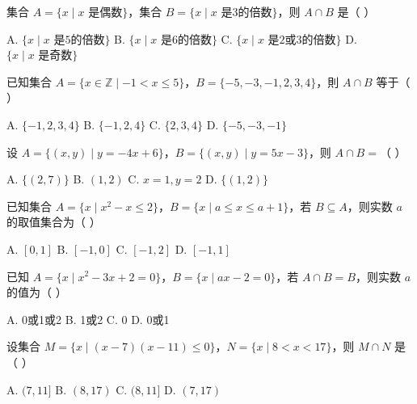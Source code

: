 \documentclass[11pt, a4paper]{article}
\begin{document}
\begin{baitap}[6]
集合 $A=\{x\mid x\text{ 是偶数}\}$，集合 $B=\{x\mid x\text{ 是3的倍数}\}$，则 $A\cap B$ 是（ ）
\par\vspace{3pt}
\noindent A. $\{x\mid x\text{ 是5的倍数}\}$ \quad B. $\{x\mid x\text{ 是6的倍数}\}$ \quad C. $\{x\mid x\text{ 是2或3的倍数}\}$ \quad D. $\{x\mid x\text{ 是奇数}\}$
\end{baitap}

\begin{baitap}[7]
已知集合 $A=\{x\in\mathbb Z\mid -1<x\le5\}$，$B=\{-5,-3,-1,2,3,4\}$，則 $A\cap B$ 等于（ ）
\par\vspace{3pt}
\noindent A. $\{-1,2,3,4\}$ \quad B. $\{-1,2,4\}$ \quad C. $\{2,3,4\}$ \quad D. $\{-5,-3,-1\}$
\end{baitap}

\begin{baitap}[8]
设 $A = \{(x,y) \mid y = -4x + 6\}$，$B = \{(x,y) \mid y = 5x - 3\}$，则 $A \cap B =$（ ）
\par\vspace{3pt}
\noindent A. $\{(2,7)\}$ \quad B. $(1,2)$ \quad C. $x = 1, y = 2$ \quad D. $\{(1,2)\}$
\end{baitap}

\begin{baitap}[9]
已知集合 $A=\{x\mid x^2-x\le2\}$，$B=\{x\mid a\le x\le a+1\}$，若 $B\subseteq A$，则实数 $a$ 的取值集合为（ ）
\par\vspace{3pt}
\noindent A. $[0,1]$ \quad B. $[-1,0]$ \quad C. $[-1,2]$ \quad D. $[-1,1]$
\end{baitap}

\begin{baitap}[10]
已知 $A = \{x \mid x^2 - 3x + 2 = 0\}$，$B = \{x \mid ax - 2 = 0\}$，若 $A \cap B = B$，则实数 $a$ 的值为（ ）
\par\vspace{3pt}
\noindent A. 0或1或2 \quad B. 1或2 \quad C. 0 \quad D. 0或1
\end{baitap}

\begin{baitap}[11]
设集合 $M=\{x\mid (x-7)(x-11)\le0\}$，$N=\{x\mid 8<x<17\}$，则 $M\cap N$ 是（ ）
\par\vspace{3pt}
\noindent A. $(7,11]$ \quad B. $(8,17)$ \quad C. $(8,11]$ \quad D. $(7,17)$
\end{baitap}
\end{document}
